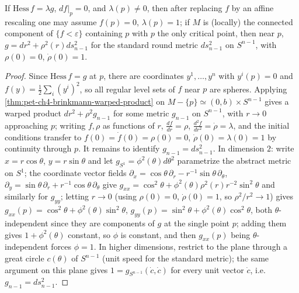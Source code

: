 \begin{theorem}
  \label{thm:pet-ch4-brinkmann-critical-point}
  If $\mathrm{Hess}\,f=\lambda g$, $df|_p=0$, and $\lambda(p)\ne0$, then after
  replacing $f$ by an affine rescaling one may assume $f(p)=0$, $\lambda(p)=1$;
  if $M$ is (locally) the connected component of $\{f<\varepsilon\}$ containing
  $p$ with $p$ the only critical point, then near $p$,
  $g=dr^2+\rho^2(r)ds_{n-1}^2$ for the standard round metric $ds_{n-1}^2$ on
  $S^{n-1}$, with $\rho(0)=0$, $\dot\rho(0)=1$.
\end{theorem}
\begin{proof}
  Since $\mathrm{Hess}\,f=g$ at $p$, there are coordinates $y^1,\dots,y^n$ with
  $y^i(p)=0$ and $f(y)=\tfrac12\sum_i(y^i)^2$, so all regular level sets of $f$
  near $p$ are spheres. Applying \cref{thm:pet-ch4-brinkmann-warped-product} on
  $M-\{p\}\simeq(0,b)\times S^{n-1}$ gives a warped product
  $dr^2+\rho^2g_{n-1}$ for some metric $g_{n-1}$ on $S^{n-1}$, with $r\to0$
  approaching $p$; writing $f,\rho$ as functions of $r$,
  $\tfrac{df}{dr}=\rho$, $\tfrac{d^2f}{dr^2}=\dot\rho=\lambda$, and the initial
  conditions transfer to $f(0)=\dot f(0)=\rho(0)=0$, $\dot\rho(0)=\lambda(0)=1$
  by continuity through $p$. It remains to identify $g_{n-1}=ds_{n-1}^2$. In
  dimension $2$: write $x=r\cos\theta$, $y=r\sin\theta$ and let $g_{S^1}=\phi^2(\theta)d\theta^2$
  parametrize the abstract metric on $S^1$; the coordinate vector fields
  $\partial_x=\cos\theta\,\partial_r-r^{-1}\sin\theta\,\partial_\theta$,
  $\partial_y=\sin\theta\,\partial_r+r^{-1}\cos\theta\,\partial_\theta$ give
  $g_{xx}=\cos^2\theta+\phi^2(\theta)\rho^2(r)r^{-2}\sin^2\theta$ and similarly
  for $g_{yy}$; letting $r\to0$ (using $\rho(0)=0$, $\dot\rho(0)=1$, so
  $\rho^2/r^2\to1$) gives $g_{xx}(p)=\cos^2\theta+\phi^2(\theta)\sin^2\theta$,
  $g_{yy}(p)=\sin^2\theta+\phi^2(\theta)\cos^2\theta$, both $\theta$-independent
  since they are components of $g$ at the single point $p$; adding them gives
  $1+\phi^2(\theta)$ constant, so $\phi$ is constant, and then $g_{xx}(p)$
  being $\theta$-independent forces $\phi=1$. In higher dimensions, restrict to
  the plane through a great circle $c(\theta)$ of $S^{n-1}$ (unit speed for the
  standard metric); the same argument on this plane gives
  $1=g_{S^{n-1}}(\dot c,\dot c)$ for every unit vector $\dot c$, i.e.\
  $g_{n-1}=ds_{n-1}^2$.
\end{proof}

